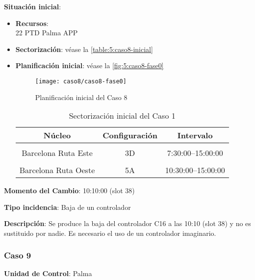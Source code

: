 \textbf{Situación inicial}:
\begin{itemize}[label={}]
	
	\item \textbf{Recursos}: \\
	22 PTD Palma APP	
	
	\item \textbf{Sectorización}: véase la \autoref{table:5:caso8-inicial}
	
	\item \textbf{Planificación inicial}: véase la \autoref{fig:5:caso8-fase0}
	
	\begin{figure}[!h]
		\centering
		\texttt{[image: caso8/caso8-fase0]}
		\caption{Planificación inicial del Caso 8}
		\label{fig:5:caso8-fase0}
	\end{figure}

	\begin{table}[h]
		\centering
		\caption{Sectorización inicial del Caso 1}
		\begin{tabular}{ccc}
			\hline
			\textbf{Núcleo}      & \textbf{Configuración} & \textbf{Intervalo}   \\ \hline
			\multicolumn{1}{l}{} & \multicolumn{1}{l}{}   & \multicolumn{1}{l}{} \\
			Barcelona Ruta Este  & 3D                     & 7:30:00--15:00:00    \\
			\multicolumn{1}{l}{} & \multicolumn{1}{l}{}   & \multicolumn{1}{l}{} \\
			Barcelona Ruta Oeste & 5A                     & 10:30:00--15:00:00   \\ \hline
		\end{tabular}
		\label{table:5:caso8-inicial}
	\end{table}
	
\end{itemize}

\textbf{Momento del Cambio}: 10:10:00 (slot 38)

\textbf{Tipo incidencia}: Baja de un controlador

\textbf{Descripción}: Se produce la baja del controlador C16 a las 10:10 (slot 38) y no es sustituido por nadie. Es necesario el uso de un controlador imaginario.


\subsubsection{Caso 9}

\textbf{Unidad de Control}: Palma

